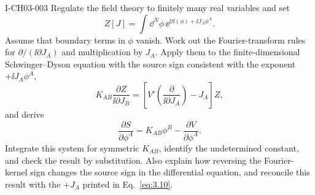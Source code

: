 \begin{exercise}{I-CH03-003}
Regulate the field theory to finitely many real variables and set
\[
 Z[J]=\int\dd^N\phi\,\ee^{\ii S(\phi)+\ii J_A\phi^A}.
\]
Assume that boundary terms in $\phi$ vanish.  Work out the Fourier-transform
rules for $\partial/(\ii\partial J_A)$ and multiplication by $J_A$.  Apply
them to the finite-dimensional Schwinger--Dyson equation with the source sign
consistent with the exponent $+\ii J_A\phi^A$,
\[
 K_{AB}\frac{\partial Z}{\ii\partial J_B}
 =\left[
 V'\!\left(\frac{\partial}{\ii\partial J_A}\right)-J_A
 \right]Z,
\]
and derive
\[
 \frac{\partial S}{\partial\phi^A}
 =K_{AB}\phi^B-\frac{\partial V}{\partial\phi^A}.
\]
Integrate this system for symmetric $K_{AB}$, identify the undetermined
constant, and check the result by substitution.  Also explain how reversing
the Fourier-kernel sign changes the source sign in the differential equation,
and reconcile this result with the $+J_A$ printed in Eq.~\eqref{eq:3.10}.
\end{exercise}
